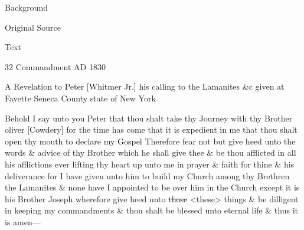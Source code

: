 			\begin{description}
				\item[Background]
			\end{description}
			
			
			\begin{description}
				\item[Original Source]
			\end{description}
			
			
			\begin{description}
				\item[Text]
			\end{description}
			
				\begin{tightcenter}
				32 Commandment AD 1830
				\end{tightcenter}
				
				A Revelation to Peter [Whitmer Jr.] his calling to the Lamanites \&c given at Fayette Seneca County state of New York
				
				Behold I say unto you Peter that thou shalt take thy Journey with thy Brother oliver [Cowdery] for the time has come that it is expedient in me that thou shalt open thy mouth to declare my Gospel Therefore fear not but give heed unto the words \& advice of thy Brother which he shall give thee \& be thou afflicted in all his afflictions ever lifting thy heart up unto me in prayer \& faith for thine \& his deliverance for I have given unto him to build my Church among thy Brethren the Lamanites \& none have I appointed to be over him in the Church except it is his Brother Joseph wherefore give heed unto \sout{those} <these> things \& be dilligent in keeping my commandments \& thou shalt be blessed unto eternal life \& thus it is amen---
				
